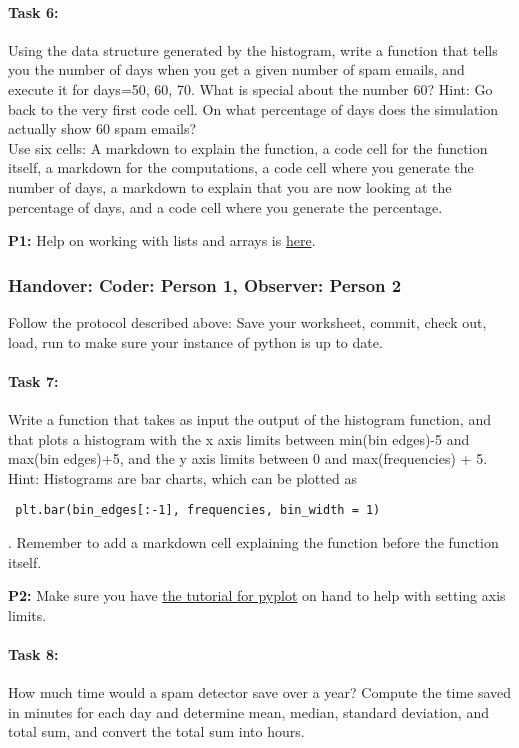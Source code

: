 \documentclass{article}
\begin{document}
\paragraph{Task 6:} Using the data structure generated by the histogram, write a function that tells you the number of days when you get a given number of spam emails, and execute it for days=50, 60, 70. What is special about the number 60? Hint: Go back to the very first code cell. On what percentage of days does the simulation actually show 60 spam emails?   \\
Use six cells: A markdown to explain the function, a code cell for the function itself, a markdown for the computations, a code cell where you generate the number of days, a markdown to explain that you are now looking at the percentage of days, and a code cell where you generate the percentage. 

\textbf{P1:} Help on working with lists and arrays is \href{https://docs.python.org/2/tutorial/datastructures.html#more-on-lists}{here}.


\subsubsection*{Handover: Coder: Person 1, Observer: Person 2}
Follow the protocol described above: Save your worksheet, commit, check out, load, run to make sure your instance of python is up to date. 

\paragraph{Task 7:} Write a function that takes as input the output of the histogram function, and that plots a histogram with the x axis limits between min(bin edges)-5 and max(bin edges)+5, and the y axis limits between 0 and max(frequencies) + 5.\\
Hint: Histograms are bar charts, which can be plotted as \begin{verbatim} plt.bar(bin_edges[:-1], frequencies, bin_width = 1) \end{verbatim}. Remember to add a markdown cell explaining the function before the function itself.

\textbf{P2:} Make sure you have \href{http://matplotlib.org/users/pyplot_tutorial.html}{the tutorial for pyplot} on hand to help with setting axis limits. 

\paragraph{Task 8:} How much time would a spam detector save over a year? Compute the time saved in minutes for each day and determine mean, median, standard deviation, and total sum, and convert the total sum into hours.
\end{document}

